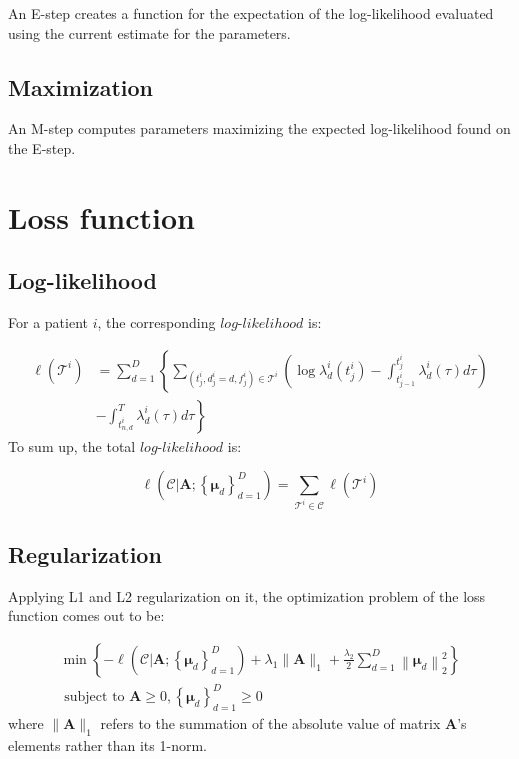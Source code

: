 \documentclass{article}
\begin{document}
		An E-step creates a function for the expectation of the log-likelihood evaluated using the current estimate for the parameters.
		
		\subsection{Maximization} 
		
		An M-step computes parameters maximizing the expected log-likelihood found on the E-step. 
	
	\section{Loss function}
	
	
	
		\subsection{Log-likelihood}
		
		For a patient $i$, the corresponding $log$-$likelihood$ is:
		
		\begin{equation}
		\begin{aligned} 
		\ell\left(\mathcal{T}^{i}\right)
		&= \sum_{d=1}^{D}\left\{\sum_{\left(t_{j}^{i}, d_{j}^{i}=d, f_{j}^{i}\right) \in \mathcal{T}^ {i}}
		\left(\log \lambda_{d}^{i}\left(t_{j}^{i}\right)-\int_{t_{j-1}^{i}}^{t_{j}^{i}} \lambda_{d}^{i}(\tau) d \tau\right)\right.
		\\
		\phantom{=\;\;}
		&-\left.\int_{t_{n, d}^{i}}^{T} \lambda_{d}^{i}(\tau) d \tau \right\}
		\end{aligned}
		\end{equation}
		To sum up, the total $log$-$likelihood$ is:

		\begin{equation}
		\ell\left(\mathcal{C} | \boldsymbol{A} ;\left\{\boldsymbol{\mu}_{d}\right\}_{d=1}^{D}\right)=\sum_{\mathcal{T}^{i} \in \mathcal{C}} \ell\left(\mathcal{T}^{i}\right)
		\end{equation}
		
		\subsection{Regularization}
		
		Applying L1 and L2 regularization on it, the optimization problem of the loss function comes out to be:
		
		\begin{equation}
		\begin{array}{l}{\min \left\{-\ell\left(\mathcal{C} | \boldsymbol{A} ;\left\{\boldsymbol{\mu}_{d}\right\}_{d=1}^{D}\right)+\lambda_{1}\|\boldsymbol{A}\|_{1}+\frac{\lambda_{2}}{2} \sum_{d=1}^{D}\left\|\boldsymbol{\mu}_{d}\right\|_{2}^{2}\right\}} \\ {\text { subject to } \boldsymbol{A} \geqslant 0,\left\{\boldsymbol{\mu}_{d}\right\}_{d=1}^{D} \geqslant 0}\end{array}
		\end{equation}
		where $\|\boldsymbol{A}\|_{1}$ refers to the summation of the absolute value of matrix $\boldsymbol{A}$'s elements rather than its 1-norm.
	
\end{document}
